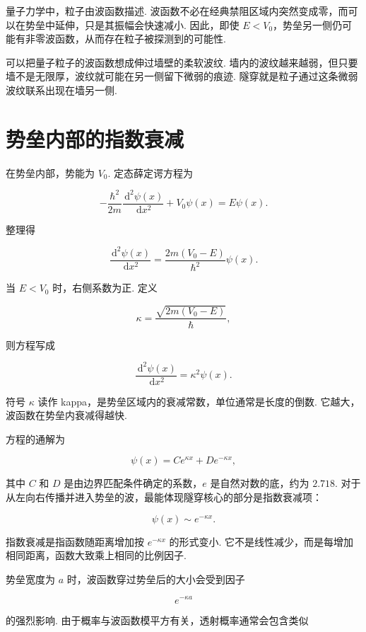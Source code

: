 \documentclass[UTF8,11pt,a4paper,openany]{ctexbook}
\newcommand{\dd}{\,\mathrm d}\newcommand{\Ham}{\hat H}\newcommand{\tr}{\operatorname{Tr}}
\begin{document}
量子力学中，粒子由波函数描述. 波函数不必在经典禁阻区域内突然变成零，而可以在势垒中延伸，只是其振幅会快速减小. 因此，即使 $E<V_0$，势垒另一侧仍可能有非零波函数，从而存在粒子被探测到的可能性. 

\begin{analogybox}
可以把量子粒子的波函数想成伸过墙壁的柔软波纹. 墙内的波纹越来越弱，但只要墙不是无限厚，波纹就可能在另一侧留下微弱的痕迹. 隧穿就是粒子通过这条微弱波纹联系出现在墙另一侧. 
\end{analogybox}

\section{势垒内部的指数衰减}

在势垒内部，势能为 $V_0$. 定态薛定谔方程为

\[
-\frac{\hbar^2}{2m}\frac{\dd^2\psi(x)}{\dd x^2}
+V_0\psi(x)=E\psi(x).
\]

整理得

\[
\frac{\dd^2\psi(x)}{\dd x^2}
=\frac{2m(V_0-E)}{\hbar^2}\psi(x).
\]

当 $E<V_0$ 时，右侧系数为正. 定义

\[
\kappa=\frac{\sqrt{2m(V_0-E)}}{\hbar},
\]

则方程写成

\[
\frac{\dd^2\psi(x)}{\dd x^2}=\kappa^2\psi(x).
\]

\begin{notationbox}
符号 $\kappa$ 读作 kappa，是势垒区域内的衰减常数，单位通常是长度的倒数. 它越大，波函数在势垒内衰减得越快. 
\end{notationbox}

方程的通解为

\[
\psi(x)=C e^{\kappa x}+D e^{-\kappa x},
\]

其中 $C$ 和 $D$ 是由边界匹配条件确定的系数，$e$ 是自然对数的底，约为 $2.718$. 对于从左向右传播并进入势垒的波，最能体现隧穿核心的部分是指数衰减项：

\[
\psi(x)\sim e^{-\kappa x}.
\]

\begin{definitionbox}
指数衰减是指函数随距离增加按 $e^{-\kappa x}$ 的形式变小. 它不是线性减少，而是每增加相同距离，函数大致乘上相同的比例因子. 
\end{definitionbox}

势垒宽度为 $a$ 时，波函数穿过势垒后的大小会受到因子

\[
e^{-\kappa a}
\]

的强烈影响. 由于概率与波函数模平方有关，透射概率通常会包含类似
\end{document}
